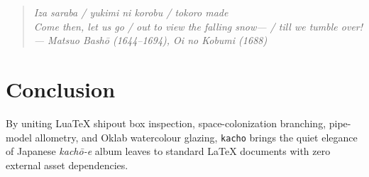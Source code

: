 \documentclass[11pt,a4paper,twoside]{article}
\begin{document}
\begin{quote}
\itshape
Iza saraba / yukimi ni korobu / tokoro made\\[2pt]
Come then, let us go / out to view the falling snow--- / till we tumble over!\\[2pt]
\upshape\small --- Matsuo Bash\=o (1644--1694), \emph{Oi no Kobumi} (1688)
\end{quote}

\section{Conclusion}

By uniting Lua\TeX{} shipout box inspection, space-colonization branching, pipe-model allometry, and Oklab watercolour glazing, \texttt{kacho} brings the quiet elegance of Japanese \emph{kach\=o-e} album leaves to standard \LaTeX{} documents with zero external asset dependencies.
\end{document}
